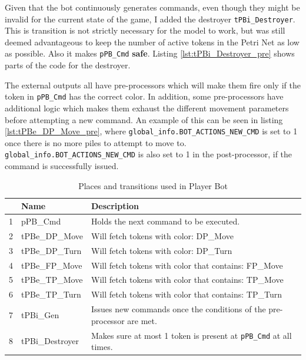 \documentclass[runningheads,a4paper]{llncs}
\newcommand{\GPenSIM}{../GPenSIM}
\begin{document}
Given that the bot continuously generates commands, even though they might be invalid for the current state of the game, I added the \ac{destroyer} \verb!tPBi_Destroyer!. This is transition is not strictly necessary for the model to work, but was still deemed advantageous to keep the number of active tokens in the Petri Net as low as possible. Also it makes \verb!pPB_Cmd! \textbf{safe}. Listing \ref{lst:tPBi_Destroyer_pre} shows parts of the code for the \ac{destroyer}.



The external outputs all have pre-processors which will make them fire only if the token in \verb!pPB_Cmd! has the correct color. In addition, some pre-processors have additional logic which makes them exhaust the different movement parameters before attempting a new command. An example of this can be seen in listing \ref{lst:tPBe_DP_Move_pre}, where \verb!global_info.BOT_ACTIONS_NEW_CMD! is set to 1 once there is no more piles to attempt to move to. \verb!global_info.BOT_ACTIONS_NEW_CMD! is also set to 1 in the post-processor, if the command is successfully issued.


\begin{table}
	\caption{Places and transitions used in Player Bot}
	\begin{tabular}{|l|l|l|}
		\hline
		& Name & Description \\
		\hline
		1 & pPB\_Cmd          & Holds the next command to be executed. \\ \hline
		2 & tPBe\_DP\_Move    & Will fetch tokens with color: DP\_Move\\ \hline
		3 & tPBe\_DP\_Turn    & Will fetch tokens with color: DP\_Turn\\ \hline
		4 & tPBe\_FP\_Move    & Will fetch tokens with color that contains: FP\_Move \\ \hline
		5 & tPBe\_TP\_Move    & Will fetch tokens with color that contains: TP\_Move \\ \hline
		6 & tPBe\_TP\_Turn    & Will fetch tokens with color that contains: TP\_Turn \\ \hline
		7 & tPBi\_Gen         & Issues new commands once the conditions of the pre-processor are met. \\ \hline
		8 & tPBi\_Destroyer   & Makes sure at most 1 token is present at \verb!pPB_Cmd! at all times. \\ \hline
	\end{tabular}
\end{table}
\clearpage
\end{document}
